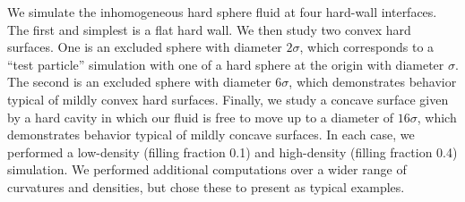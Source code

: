 We simulate the inhomogeneous hard sphere fluid at four hard-wall
interfaces.  The first and simplest is a flat hard wall.  We then
study two convex hard surfaces.  One is an excluded sphere with
diameter $2\sigma$, which corresponds to a ``test particle''
simulation with one of a hard sphere at the origin with diameter
$\sigma$.  The second is an excluded sphere with diameter $6\sigma$,
which demonstrates behavior typical of mildly convex hard surfaces.
Finally, we study a concave surface given by a hard cavity in which
our fluid is free to move up to a diameter of $16\sigma$, which
demonstrates behavior typical of mildly concave surfaces.  In each
case, we performed a low-density (filling fraction 0.1) and
high-density (filling fraction 0.4) simulation.  We performed
additional computations over a wider range of curvatures and
densities, but chose these to present as typical examples.



